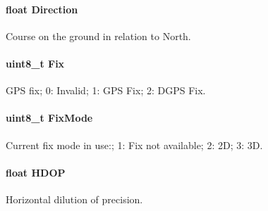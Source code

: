 \paragraph[{Direction}]{\setlength{\rightskip}{0pt plus 5cm}float Direction}\label{struct_t_m___g_p_s___data__t_ae2fdd834ad7e266ee87728da45d6da23}
Course on the ground in relation to North. \hypertarget{struct_t_m___g_p_s___data__t_a515ce3d2bd3474446275a430a2f652c3}{}
\paragraph[{Fix}]{\setlength{\rightskip}{0pt plus 5cm}uint8\+\_\+t Fix}\label{struct_t_m___g_p_s___data__t_a515ce3d2bd3474446275a430a2f652c3}
G\+P\+S fix; 0\+: Invalid; 1\+: G\+P\+S Fix; 2\+: D\+G\+P\+S Fix. \hypertarget{struct_t_m___g_p_s___data__t_a9c26de3f6932e8ef1ffcf461733ceffb}{}
\paragraph[{Fix\+Mode}]{\setlength{\rightskip}{0pt plus 5cm}uint8\+\_\+t Fix\+Mode}\label{struct_t_m___g_p_s___data__t_a9c26de3f6932e8ef1ffcf461733ceffb}
Current fix mode in use\+:; 1\+: Fix not available; 2\+: 2\+D; 3\+: 3\+D. \hypertarget{struct_t_m___g_p_s___data__t_ab9956f8a7c5930b1a64d60b162559a28}{}
\paragraph[{H\+D\+O\+P}]{\setlength{\rightskip}{0pt plus 5cm}float H\+D\+O\+P}\label{struct_t_m___g_p_s___data__t_ab9956f8a7c5930b1a64d60b162559a28}
Horizontal dilution of precision. \hypertarget{struct_t_m___g_p_s___data__t_a81398e75d8a39d3b3ef55b4da09fcfe3}{}
